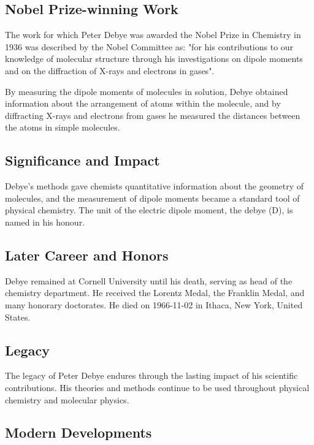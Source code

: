 \subsection*{Nobel Prize-winning Work}

The work for which Peter Debye was awarded the Nobel Prize in Chemistry in 1936 was described by the Nobel Committee as: "for his contributions to our knowledge of molecular structure through his investigations on dipole moments and on the diffraction of X-rays and electrons in gases".

By measuring the dipole moments of molecules in solution, Debye obtained information about the arrangement of atoms within the molecule, and by diffracting X-rays and electrons from gases he measured the distances between the atoms in simple molecules.

\subsection*{Significance and Impact}

Debye's methods gave chemists quantitative information about the geometry of molecules, and the measurement of dipole moments became a standard tool of physical chemistry.
The unit of the electric dipole moment, the debye (D), is named in his honour.

\subsection*{Later Career and Honors}

Debye remained at Cornell University until his death, serving as head of the chemistry department.
He received the Lorentz Medal, the Franklin Medal, and many honorary doctorates.
He died on 1966-11-02 in Ithaca, New York, United States.

\subsection*{Legacy}

The legacy of Peter Debye endures through the lasting impact of his scientific contributions.
His theories and methods continue to be used throughout physical chemistry and molecular physics.

\subsection*{Modern Developments}

